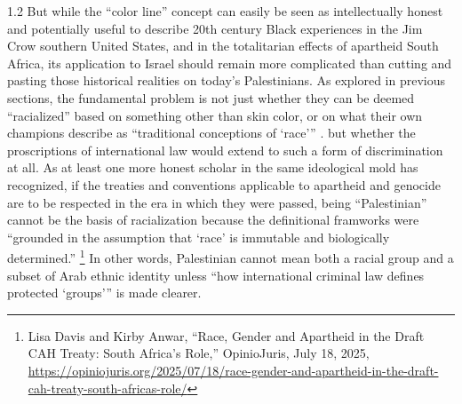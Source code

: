 \documentclass[../unravbook.tex]{subfiles}
\begin{document}
\begin{spacing}{1.2}
But while the ``color line'' concept can easily be seen as intellectually honest and potentially useful to describe 20th century Black experiences in the Jim Crow southern United States, and in the totalitarian effects of apartheid South Africa, its application to Israel should remain more complicated than cutting and pasting those historical realities on today's Palestinians. As explored in previous sections, the fundamental problem is not just whether they can be deemed \enquote{racialized} based on something other than skin color, or on what their own champions describe as \enquote{traditional conceptions of \enquote*{race}} \parencite[885]{Dugard-2013}. but whether the proscriptions of international law would extend to such a form of discrimination at all. As at least one more honest scholar in the same ideological mold has recognized, if the treaties and conventions applicable to apartheid and genocide are to be respected in the era in which they were passed, being \enquote{Palestinian} cannot be the basis of racialization because the definitional framworks were \enquote{grounded in the assumption that \enquote*{race} is immutable and biologically determined.} \footnote{Lisa Davis and Kirby Anwar, \enquote{Race, Gender and Apartheid in the Draft CAH Treaty: South Africa's Role,} OpinioJuris, July 18, 2025, \url{https://opiniojuris.org/2025/07/18/race-gender-and-apartheid-in-the-draft-cah-treaty-south-africas-role/}} In other words, Palestinian cannot mean both a racial group and a subset of Arab ethnic identity unless \enquote{how international criminal law defines protected \enquote*{groups}} is made clearer.


\end{spacing}
\end{document}
